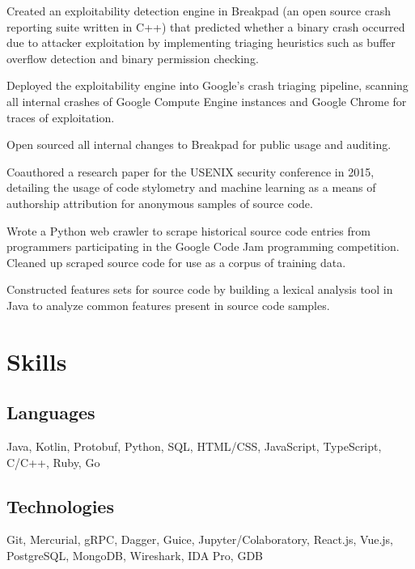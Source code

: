 \documentclass[]{template}
\begin{document}
\sectionsep

\hfill
{}
\begin{tightemize}
\item
  Created an exploitability detection engine in Breakpad (an open source crash
  reporting suite written in C++) that predicted whether a binary
  crash occurred due to attacker exploitation by implementing triaging heuristics
  such as buffer overflow detection and binary permission checking.
\item
  Deployed the exploitability engine into Google's crash triaging pipeline,
  scanning all internal crashes of Google Compute Engine instances and Google
  Chrome for traces of exploitation.
\item
  Open sourced all internal changes to Breakpad for public usage and auditing.
\end{tightemize}

\sectionsep

\hfill
{}
\begin{tightemize}
\item
  Coauthored a research paper for the USENIX security conference in 2015,
  detailing the usage of code stylometry and machine learning as a means of
  authorship attribution for anonymous samples of source code.
\item
  Wrote a Python web crawler to scrape historical source code entries from
  programmers participating in the Google Code Jam programming competition.
  Cleaned up scraped source code for use as a corpus of training data.
\item
  Constructed features sets for source code by building a lexical analysis tool
  in Java to analyze common features present in source code samples.
\end{tightemize}

\section{Skills}

\subsection{Languages}
Java,
Kotlin,
Protobuf,
Python,
SQL,
HTML/CSS,
JavaScript,
TypeScript,
C/C++,
Ruby,
Go

\sectionsep

\subsection{Technologies}
Git,
Mercurial,
gRPC,
Dagger,
Guice,
Jupyter/Colaboratory,
React.js,
Vue.js,
PostgreSQL,
MongoDB,
Wireshark,
IDA Pro,
GDB
\end{document}
